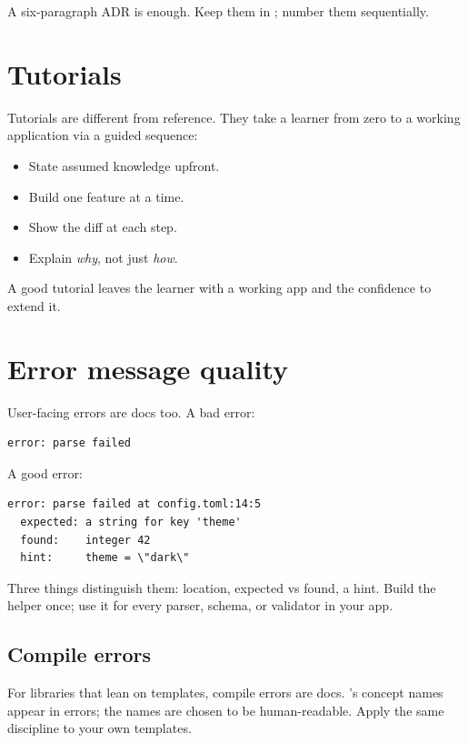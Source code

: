 A six-paragraph ADR is enough. Keep them in
; number them sequentially.

\section{Tutorials}

Tutorials are different from reference. They take a learner
from zero to a working application via a guided sequence:

\begin{itemize}[leftmargin=*]
  \item State assumed knowledge upfront.
  \item Build one feature at a time.
  \item Show the diff at each step.
  \item Explain \emph{why}, not just \emph{how}.
\end{itemize}

A good tutorial leaves the learner with a working app and the
confidence to extend it.

\section{Error message quality}

User-facing errors are docs too. A bad error:

\begin{lstlisting}
error: parse failed
\end{lstlisting}

A good error:

\begin{lstlisting}
error: parse failed at config.toml:14:5
  expected: a string for key 'theme'
  found:    integer 42
  hint:     theme = \"dark\"
\end{lstlisting}

Three things distinguish them: location, expected vs found,
a hint. Build the helper once; use it for every parser, schema,
or validator in your app.

\subsection*{Compile errors}

For libraries that lean on templates, compile errors are
docs. \maya{}'s concept names appear in errors; the names are
chosen to be human-readable. Apply the same discipline to your
own templates.

